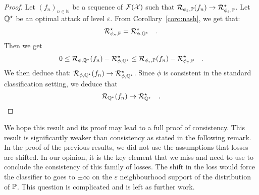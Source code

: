 \begin{proof}
Let $(f_n)_{n\in\mathbb{N}}$ be a sequence of $\mathcal{F}(\mathcal{X})$ such that $\mathcal{R}_{\phi_\varepsilon,\mathbb{P}}(f_n)\to\mathcal{R}_{\phi_\varepsilon,\mathbb{P}}^\star$. Let $\mathbb{Q}^\star$ be an optimal attack of level $\varepsilon$. From Corollary~\ref{coro:nash}, we get that:
\begin{align*}
    \mathcal{R}_{\phi_\varepsilon,\mathbb{P}}^\star =   \mathcal{R}_{\phi,\mathbb{Q}^\star}^\star\quad.
\end{align*} Then we get 
\begin{align*}
   0\leq \mathcal{R}_{\phi,\mathbb{Q}^\star}(f_n)- \mathcal{R}_{\phi,\mathbb{Q}^\star}^\star \leq \mathcal{R}_{\phi_\varepsilon,\mathbb{P}}(f_n)-\mathcal{R}_{\phi_\varepsilon,\mathbb{P}}^\star\quad.
\end{align*}
We then deduce that: $\mathcal{R}_{\phi,\mathbb{Q}^\star}(f_n)\to \mathcal{R}_{\phi,\mathbb{Q}^\star}^\star$. Since $\phi$ is consistent in the standard classification setting, we deduce that 
\begin{align*}
    \mathcal{R}_{\mathbb{Q}^\star}(f_n)\to \mathcal{R}_{\mathbb{Q}^\star}^\star\quad.
\end{align*}
\end{proof}
 

We hope this result and its proof may lead to a full proof of consistency. This result is significantly weaker than consistency as stated in the following remark. In the proof of the previous results, we did not use the assumptions that losses are shifted. In our opinion, it is the key element that we miss and need to use to conclude the consistency of this family of losses. The shift in the loss would force the classifier to goes to $\pm \infty$ on the $\varepsilon$ neighbourhood support of the distribution of $\mathbb{P}$. This question is complicated and is left as further work.  
